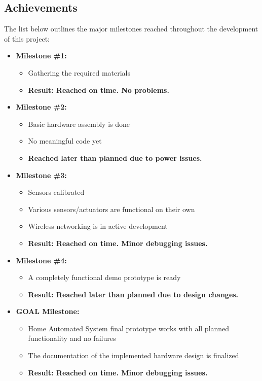 \documentclass[journal,onecolumn]{IEEEtran}
\begin{document}
\subsection{Achievements}
The list below outlines the major milestones reached throughout the development of this project:
\begin{itemize}
	\item{\textbf{Milestone \#1:}}
		\begin{itemize}
		\item{Gathering the required materials}
		\item{\textbf{Result: Reached on time. No problems.}}
		\end{itemize}
	\item{\textbf{Milestone \#2:}}
		\begin{itemize}
		\item{Basic hardware assembly is done}
		\item{No meaningful code yet}
		\item{\textbf{Reached later than planned due to power issues.}}
		\end{itemize}
	\item{\textbf{Milestone \#3:}}
		\begin{itemize}
		\item{Sensors calibrated}
		\item{Various sensors/actuators are functional on their own}
		\item{Wireless networking is in active development}
		\item{\textbf{Result: Reached on time. Minor debugging issues.}}
		\end{itemize}
	\item{\textbf{Milestone \#4:}}
		\begin{itemize}
		\item{ A completely functional demo prototype is ready}
		\item{\textbf{Result: Reached later than planned due to design changes.}}
		\end{itemize}
	\item{\textbf{GOAL Milestone:}  }
		\begin{itemize}
		\item{Home Automated System final prototype works with all planned functionality and no failures}
		\item{The documentation of the implemented hardware design is finalized}
		\item{\textbf{Result: Reached on time. Minor debugging issues.}}
		\end{itemize}
\end{itemize}
\end{document}

